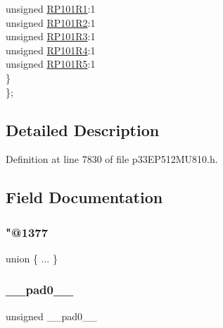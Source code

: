 \begin{DoxyCompactItemize}
\begin{tabbing}
\>\>unsigned \hyperlink{structtag_r_p_o_r9_b_i_t_s_ab81c4dd64e5162e3ddc351fb56505019}{RP101R1}:1\\
\>\>unsigned \hyperlink{structtag_r_p_o_r9_b_i_t_s_a95d247cfce3365d7e96c8defbe4cd0f8}{RP101R2}:1\\
\>\>unsigned \hyperlink{structtag_r_p_o_r9_b_i_t_s_a8f30be2b72d59daa681b6b6133ab12ce}{RP101R3}:1\\
\>\>unsigned \hyperlink{structtag_r_p_o_r9_b_i_t_s_ab0738b1cb66d65302ab0868e053a07db}{RP101R4}:1\\
\>\>unsigned \hyperlink{structtag_r_p_o_r9_b_i_t_s_a7ca3ccc6bac6c850e9ac7c8b6640b0fb}{RP101R5}:1\\
\>\} \\
\}; \\

\end{tabbing}\end{DoxyCompactItemize}


\subsection{Detailed Description}


Definition at line 7830 of file p33\+E\+P512\+M\+U810.\+h.



\subsection{Field Documentation}
\mbox{\label{structtag_r_p_o_r9_b_i_t_s_a8edaf96f21785cf6a2ed47b4e422a7fa}} 
\subsubsection{\texorpdfstring{"@1377}{@1377}}
{\footnotesize\ttfamily union \{ ... \} }

\mbox{\label{structtag_r_p_o_r9_b_i_t_s_adf71f3d8410c1f1dbbc96680a92c49af}} 
\subsubsection{\texorpdfstring{\+\_\+\+\_\+pad0\+\_\+\+\_\+}{\_\_pad0\_\_}}
{\footnotesize\ttfamily unsigned \+\_\+\+\_\+pad0\+\_\+\+\_\+}



